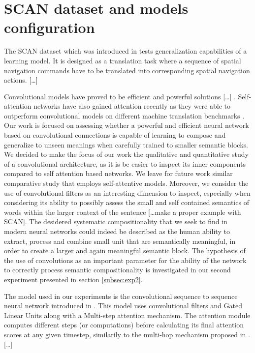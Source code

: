 \section{SCAN dataset and models configuration}
\label{sec:setup}

The SCAN dataset which was introduced in \cite{Lake:Baroni:2017} tests generalization capabilities of a learning model.
It is designed as a translation task where a sequence of spatial navigation commands have to be translated into corresponding 
spatial navigation actions. [\dots] 

Convolutional models have proved to be efficient and powerful solutions [\dots] \cite{kalchbrenner:etal:2016, gehring:etal:2017}.
Self-attention networks have also gained attention recently as they were able to outperform convolutional models on different
machine translation benchmarks \cite{chen:etal:2018,vaswani:etal:2017}.
Our work is focused on assessing whether a powerful and efficient neural network based on convolutional connections
is capable of learning to compose and generalize to unseen meanings when carefully trained to smaller semantic blocks.
We decided to make the focus of our work the qualitative and quantitative study of a convolutional architecture, as
it is be easier to inspect its inner components compared to self attention based networks.
We leave for future work similar comparative study that employs self-attentive models.
Moreover, we consider the use of convolutional filters as an interesting dimension to inspect, especially when considering 
its ability to possibly assess the small and self contained semantics of words within the larger context of the sentence [\dots make a proper example with SCAN].
The desidered systematic compositionality that we seek to find in modern neural networks could indeed be described as the
human ability to extract, process and combine small unit that are semantically meaningful, in order to create a larger and again meaningful semantic block.
The hypothesis of the use of convolutions as an important parameter for the ability of the network
to correctly process semantic compositionality is investigated in our second experiment presented in section \ref{subsec:exp2}.

The model used in our experiments is the convolutional sequence to sequence neural network introduced in \cite{gehring:etal:2017}.
This model uses convolutional filters and Gated Linear Units \cite{dauphin:etal:2016} along with a Multi-step attention mechanism.
The attention module computes different steps (or computations) before calculating its final attention scores at any given timestep, similarily 
to the multi-hop mechanism proposed in \cite{sukhbaatar:etal:2105}.
[\dots]
